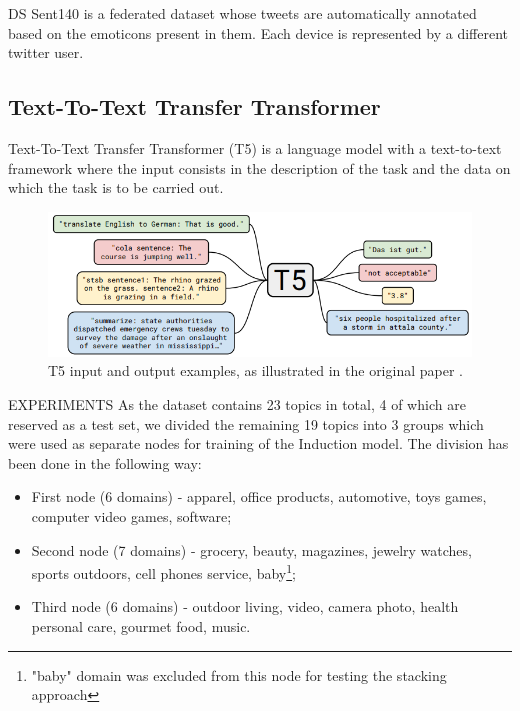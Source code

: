 


DS
Sent140 \cite{caldas2019leaf} is a federated dataset whose tweets are automatically annotated based on the emoticons present in them. Each device is represented by a different twitter user.




            \subsection{Text-To-Text Transfer Transformer}
            Text-To-Text Transfer Transformer (T5) \cite{t5} is a language model with a text-to-text framework where the input consists in the description of the task and the data on which the task is to be carried out.
            
            \begin{figure}[h]
            \begin{center}
            \includegraphics[width=\textwidth]{pics/T5.png}
            \caption{T5 input and output examples, as illustrated in the original paper \cite{t5}.}
            \label{fig:user}
            \end{center}
            \end{figure}
          
EXPERIMENTS
As the dataset contains 23 topics in total, 4 of which are reserved as a test set, we divided the remaining 19 topics into 3 groups which were used as separate nodes for training of the Induction model. The division has been done in the following way:
    \begin{itemize}
        \item First node (6 domains) - apparel, office products, automotive, toys games, computer video games, software;
        \item Second node (7 domains) - grocery, beauty, magazines, jewelry watches, sports outdoors, cell phones service, baby\footnote{"baby" domain was excluded from this node for testing the stacking approach};
        \item Third node (6 domains) - outdoor living, video, camera photo, health personal care, gourmet food, music.
    \end{itemize}
